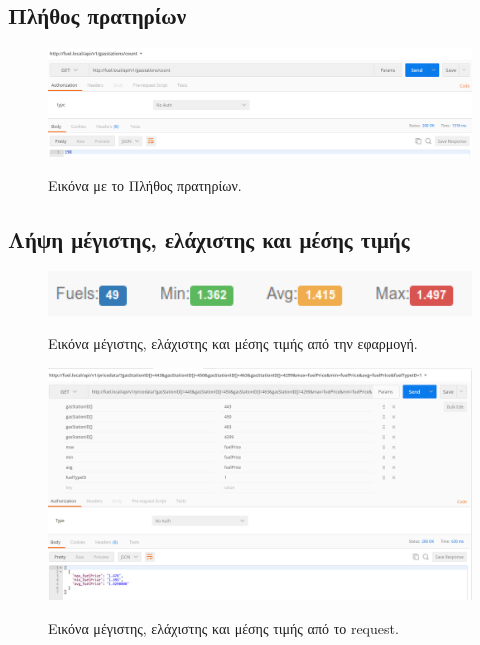 \subsection{Πλήθος πρατηρίων}

\begin{figure}[H]
  \caption{Εικόνα με το Πλήθος πρατηρίων.}
  \centering
    \includegraphics[width=1\textwidth]{img/count.png}
    \label{fig:count}
\end{figure}

\subsection{Λήψη μέγιστης, ελάχιστης και μέσης τιμής}

\begin{figure}[H]
  \caption{Εικόνα μέγιστης, ελάχιστης και μέσης τιμής από την εφαρμογή.}
  \centering
    \includegraphics[width=1\textwidth]{img/max-min.png}
    \label{fig:max-min}
\end{figure}

\begin{figure}[H]
  \caption{Εικόνα μέγιστης, ελάχιστης και μέσης τιμής από το request.}
  \centering
    \includegraphics[width=1\textwidth]{img/max-min-postman.png}
    \label{fig:max-min-postman}
\end{figure}

